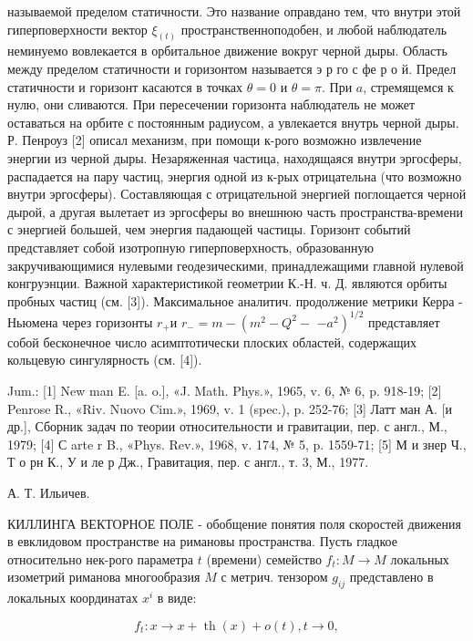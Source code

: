 \documentclass[10pt]{article}
\begin{document}
называемой пределом статичности. Это название оправдано тем, что внутри этой гиперповерхности вектор $\xi_{(t)}$ пространственноподобен, и любой наблюдатель неминуемо вовлекается в орбитальное движение вокруг черной дыры. Область между пределом статичности и горизонтом называется э р го с фе р о й. Предел статичности и горизонт касаются в точках $\theta=0$ и $\theta=\pi$. При $a$, стремящемся к нулю, они сливаются. При пересечении горизонта наблюдатель не может оставаться на орбите с постоянным радиусом, а увлекается внутрь черной дыры. Р. Пенроуз [2] описал механизм, при помощи к-рого возможно извлечение энергии из черной дыры. Незаряженная частица, находящаяся внутри эргосферы, распадается на пару частиц, энергия одной из к-рых отрицательна (что возможно внутри эргосферы). Составляющая с отрицательной энергией поглощается черной дырой, а другая вылетает из эргосферы во внешнюю часть пространства-времени с энергией большей, чем энергия падающей частицы. Горизонт событий представляет собой изотропную гиперповерхность, образованную закручивающимися нулевыми геодезическими, принадлежащими главной нулевой конгруэнции. Важной характеристикой геометрии К.-Н. ч. Д. являются орбиты пробных частиц (см. [3]). Максимальное аналитич. продолжение метрики Керра - Ньюмена через горизонты $r_{+}$и $r_{-}=m-\left(m^{2}-Q^{2}-\right.$ $\left.-a^{2}\right)^{1 / 2}$ представляет собой бесконечное число асимптотически плоских областей, содержащих кольцевую сингулярность (см. [4]).



Jum.: [1] New man E. [a. o.], «J. Math. Phys.», 1965, v. 6, № 6, p. 918-19; [2] Penrose R., «Riv. Nuovo Cim.», 1969, v. 1 (spec.), p. 252-76; [3] Латт ман А. [и др.], Сборник задач по теории относительности и гравитации, пер. с англ., М., 1979; [4] С arte r B., «Phys. Rev.», 1968, v. 174, № 5, p. 1559-71; [5] М и знер Ч., Т о рн К., У и ле р Дж., Гравитация, пер. с англ., т. 3, М., 1977.



А. Т. Ильичев.



КИЛЛИНГА ВЕКТОРНОЕ ПОЛЕ - обобщение понятия поля скоростей движения в евклидовом пространстве на римановы пространства. Пусть гладкое относительно нек-рого параметра $t$ (времени) семейство $f_{t}: M \rightarrow M$ локальных изометрий риманова многообразия $M$ с метрич. тензором $g_{i j}$ представлено в локальных координатах $x^{i}$ в виде:



\[

f_{t}: x \rightarrow x+\operatorname{th}(x)+o(t), t \rightarrow 0,

\]
\end{document}

